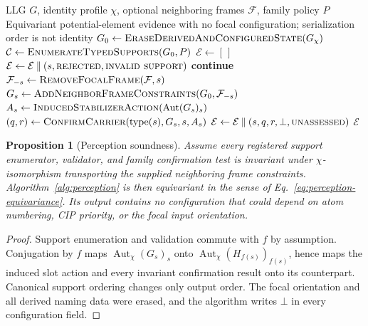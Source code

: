 \documentclass[pdflatex,sn-mathphys-num,referee,lineno]{sn-jnl}
\theoremstyle{plain}
\newtheorem{proposition}[theorem]{Proposition}
\theoremstyle{remark}
\theoremstyle{definition}
\begin{document}
\begin{algorithm}[htbp]
\caption{Focal-configuration-neutral stereo-carrier perception}
\label{alg:perception}
\begin{algorithmic}[1]
\Require LLG \(G\), identity profile \(\chi\), optional neighboring frames \(\mathcal F\), family policy \(P\)
\Ensure Equivariant potential-element evidence with no focal configuration; serialization order is not identity
\State \(G_0 \gets \Call{EraseDerivedAndConfiguredState}{G_\chi}\)
\State \(\mathcal C \gets \Call{EnumerateTypedSupports}{G_0,P}\)
\State \(\mathcal E \gets [\,]\)
    \State \(\mathcal E\gets\mathcal E\mathbin{\|}(s,\textsc{rejected},\textsc{invalid support})\)
    \State \textbf{continue}
  \EndIf
  \State \(\mathcal F_{-s}\gets\Call{RemoveFocalFrame}{\mathcal F,s}\)
  \State \(G_s\gets\Call{AddNeighborFrameConstraints}{G_0,\mathcal F_{-s}}\)
  \State \(A_s\gets\Call{InducedStabilizerAction}{\operatorname{Aut}(G_s)_s}\)
  \State \((q,r)\gets\Call{ConfirmCarrier}{\operatorname{type}(s),G_s,s,A_s}\)
  \State \(\mathcal E\gets\mathcal E\mathbin{\|}(s,q,r,\bot,\textsc{unassessed})\)
\EndFor
\State \Return \(\mathcal E\)
\end{algorithmic}
\end{algorithm}

\begin{proposition}[Perception soundness]
\label{prop:perception-soundness}
Assume every registered support enumerator, validator, and family confirmation
test is invariant under \(\chi\)-isomorphism transporting the supplied
neighboring frame constraints. Algorithm~\ref{alg:perception}
is then equivariant in the sense of Eq.~\eqref{eq:perception-equivariance}.
Its output contains no configuration that could depend on atom numbering,
CIP priority, or the focal input orientation.
\end{proposition}

\begin{proof}
Support enumeration and validation commute with \(f\) by assumption.
Conjugation by \(f\) maps
\(\operatorname{Aut}_\chi(G_s)_s\) onto
\(\operatorname{Aut}_\chi(H_{f(s)})_{f(s)}\), hence maps the induced slot
action and every invariant confirmation result onto its counterpart.
Canonical support ordering changes only output order.  The focal orientation
and all derived naming data were erased, and the algorithm writes \(\bot\) in
every configuration field.
\end{proof}
\end{document}
